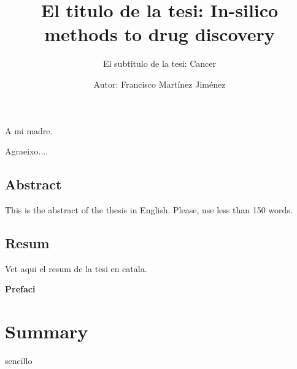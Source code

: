 \documentclass[12pt, a4paper,twoside]{tesi_upf}
\title{El titulo de la tesi: In-silico methods to drug discovery}
\subtitle{El subtitulo de la tesi: Cancer}
\author{Autor: Francisco Mart\'inez Jim\'enez}
\begin{document}
\frontmatter


\maketitle

\cleardoublepage




\noindent A mi madre. 

\cleardoublepage





 Agraeixo....

\cleardoublepage

\section*{\Large \sffamily Abstract}
This is the abstract of the thesis in English.  Please, use less
than 150 words.

\vspace*{\fill}
\section*{\Large \sffamily  Resum}

Vet aqui el resum de la tesi en catala.  
\vspace*{\fill}
\cleardoublepage


{\bf Prefaci}

\cleardoublepage



\tableofcontents


\listoffigures



\listoftables



\mainmatter

\chapter*{Summary}

sencillo
\end{document}
